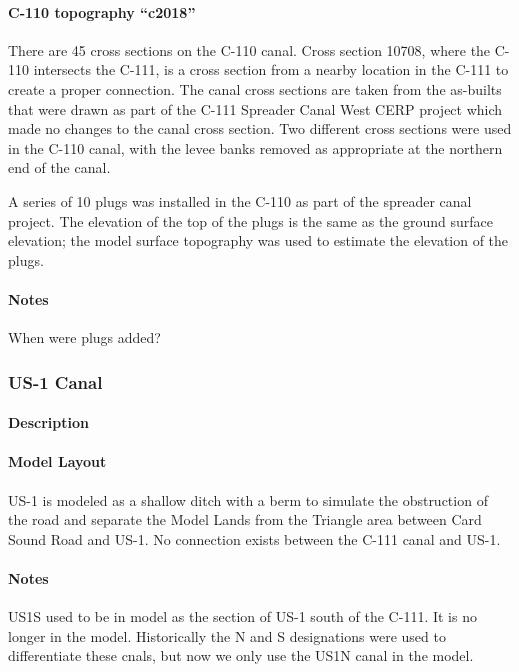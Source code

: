 \paragraph{C-110 topography ``c2018''}
There are 45 cross sections on the C-110 canal.  Cross section 10708, where the C-110 intersects the C-111, is a cross section from a nearby location in the C-111 to create a proper connection.    The canal cross sections are taken from the as-builts that were drawn as part of the C-111 Spreader Canal West CERP project which made no changes to the canal cross section\citep{USACE2011C111Spreader}.  Two different cross sections were used in the C-110 canal, with the levee banks removed as appropriate at the northern end of the canal.

A series of 10 plugs was installed in the C-110 as part of the spreader canal project.  The elevation of the top of the plugs is the same as the ground surface elevation; the model surface topography was used to estimate the elevation of the plugs\citep{USACE2011C111Spreader}.

\begin{notes}
\paragraph{Notes}
When were plugs added?
\end{notes}

\clearpage
\subsubsection{US-1 Canal}
\paragraph{Description}

\paragraph{Model Layout}
US-1 is modeled as a shallow ditch with a berm to simulate the obstruction of the road and separate the Model Lands from the Triangle area between Card Sound Road and US-1.
No connection exists between the C-111 canal and US-1.


\begin{notes}
\paragraph{Notes}
US1S used to be in model as the section of US-1 south of the C-111. It is no longer in the model. Historically the N and S designations were used to differentiate these cnals, but now we only use the US1N canal in the model.
\end{notes}


